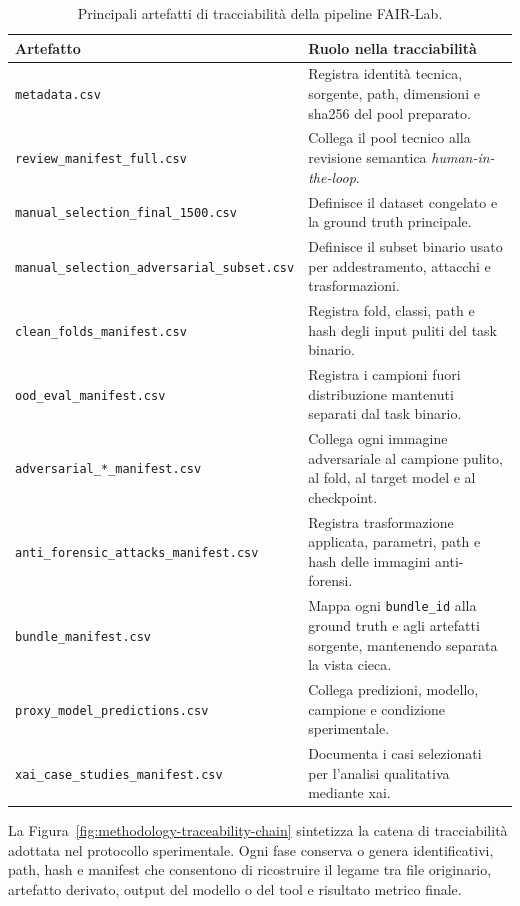 \begin{table}[H]
\centering
\caption{Principali artefatti di tracciabilità della pipeline FAIR-Lab.}
\label{tab:methodology-traceability-artifacts}
\begin{tabularx}{\textwidth}{@{}lX@{}}
\toprule
\textbf{Artefatto} & \textbf{Ruolo nella tracciabilità} \\
\midrule
\texttt{metadata.csv}
&
Registra identità tecnica, sorgente, path, dimensioni e \gls{sha256} del pool
preparato. \\
\texttt{review\_manifest\_full.csv}
&
Collega il pool tecnico alla revisione semantica \textit{human-in-the-loop}. \\
\texttt{manual\_selection\_final\_1500.csv}
&
Definisce il dataset congelato e la ground truth principale. \\
\texttt{manual\_selection\_adversarial\_subset.csv}
&
Definisce il subset binario usato per addestramento, attacchi e trasformazioni. \\
\texttt{clean\_folds\_manifest.csv}
&
Registra fold, classi, path e hash degli input puliti del task binario. \\
\texttt{ood\_eval\_manifest.csv}
&
Registra i campioni fuori distribuzione mantenuti separati dal task binario. \\
\texttt{adversarial\_*\_manifest.csv}
&
Collega ogni immagine adversariale al campione pulito, al fold, al target model
e al checkpoint. \\
\texttt{anti\_forensic\_attacks\_manifest.csv}
&
Registra trasformazione applicata, parametri, path e hash delle immagini
anti-forensi. \\
\texttt{bundle\_manifest.csv}
&
Mappa ogni \texttt{bundle\_id} alla ground truth e agli artefatti sorgente,
mantenendo separata la vista cieca. \\
\texttt{proxy\_model\_predictions.csv}
&
Collega predizioni, modello, campione e condizione sperimentale. \\
\texttt{xai\_case\_studies\_manifest.csv}
&
Documenta i casi selezionati per l'analisi qualitativa mediante \gls{xai}. \\
\bottomrule
\end{tabularx}
\end{table}


La Figura~\ref{fig:methodology-traceability-chain} sintetizza la catena di
tracciabilità adottata nel protocollo sperimentale. Ogni fase conserva o genera
identificativi, path, hash e manifest che consentono di ricostruire il legame
tra file originario, artefatto derivato, output del modello o del tool e risultato
metrico finale.

